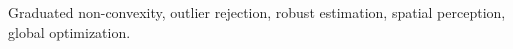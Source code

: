 \begin{abstract}
\end{abstract}

\begin{IEEEkeywords}Graduated non-convexity, outlier rejection, robust estimation, spatial perception, global optimization.
\end{IEEEkeywords}